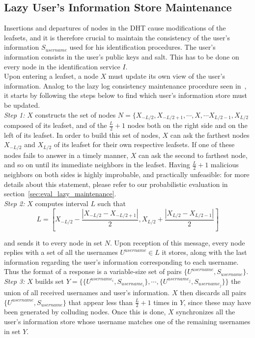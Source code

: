 \subsection{Lazy User's Information Store Maintenance}
\label{sec:lazy_node_maintenance}
Insertions and departures of nodes in the DHT cause modifications of the
leafsets, and it is therefore crucial to maintain the consistency of the user's
information $S_{username}$ used for his identification procedures. The user's information
consists in the user's public keys and salt. This has to be done on every node in the identification service
$I$.\\

Upon entering a leafset, a node $X$ must update its own view of the user's
information. Analog to the lazy log consistency maintenance procedure seen
in~\cite{p2p_certification}, it starts by following the steps below to find
which user's information store must be updated.\\

\textit{Step 1:} $X$ constructs the set of nodes
$N = \{ X_{-L/2}, X_{-L/2 +1}, \cdots, X, \cdots X_{L/2 -1}, X_{L/2} $
composed of its leafset, and of the $\frac{L}{2} +1$ nodes both on the right
side and on the left of its leafset. 
In order to build this set of nodes, $X$ can ask the farthest nodes $X_{-L/2}$
and $X_{L/2}$ of its leafset for their own respective leafsets. If one of these
nodes fails to answer in a timely manner, $X$ can ask the second to farthest
node, and so on until its immediate neighbors in the leafset. Having
$\frac{L}{2} +1$ malicious neighbors on both sides is highly improbable, and
practically unfeasible: for more details about this statement, please refer to
our probabilistic evaluation in section~\eqref{sec:eval_lazy_maintenance}. \\

\textit{Step 2:} $X$ computes interval $L$ such that
$$
L = [ X_{-L/2} - \frac{| X_{-L/2} - X_{-L/2 +1} |}{2}, X_{L/2} +\frac{|
X_{L/2} - X_{L/2 -1} |}{2} ]
$$


and sends it to every node in set $N$. Upon reception of this message, every
node replies with a set of all the usernames $U^{username} \in L$ it
stores, along with the last information regarding the user's
information corresponding to each username. Thus the format of a response is a
variable-size set of pairs $\{ U^{username}, S_{username}\}$.\\


\textit{Step 3:} $X$ builds set 
$Y =  \{ \{U^{username_i}, S_{username_i}\},\cdots,\{ U^{username_j},
S_{username_j}\} \} $ the union of all received usernames and user's
information. $X$ then discards all pairs $\{ U^{username}, S_{username}\}$ that
appear less than $\frac{L}{2} +1$ times in $Y$, since these may have been
generated by colluding nodes. Once this is done, $X$ synchronizes all the
user's information store whose username matches one of the remaining usernames
in set $Y$.\\

